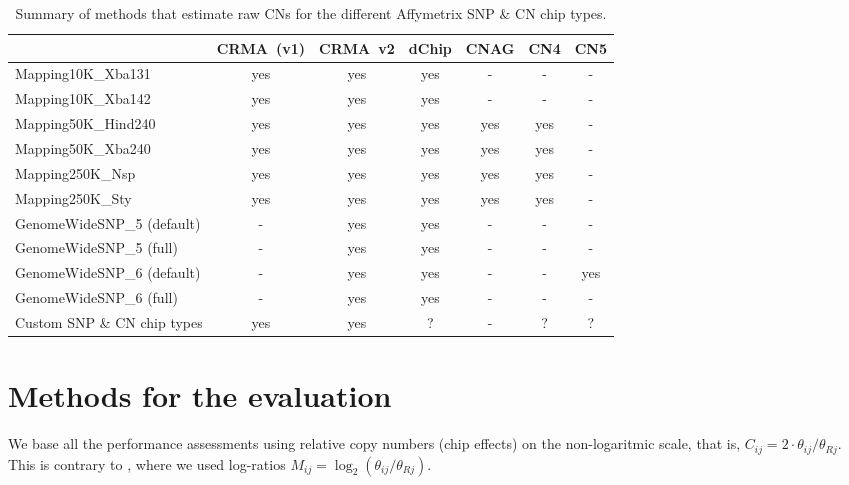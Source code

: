 \documentclass[10pt,a4paper]{article}
\begin{document}

\begin{table}[htp]
\begin{center}
\begin{tabular}{|l|cc|c|c|cc|}
\hline
                             & CRMA~(v1) & CRMA~v2 & dChip & CNAG & CN4 & CN5 \\
\hline
\hline
Mapping10K\_Xba131           & yes     & yes       & yes   &    - &   - &  -  \\
Mapping10K\_Xba142           & yes     & yes       & yes   &    - &   - &  -  \\
\hline
Mapping50K\_Hind240          & yes     & yes       & yes   &  yes & yes &  -  \\
Mapping50K\_Xba240           & yes     & yes       & yes   &  yes & yes &  -  \\
\hline
Mapping250K\_Nsp             & yes     & yes       & yes   &  yes & yes &  -  \\
Mapping250K\_Sty             & yes     & yes       & yes   &  yes & yes &  -  \\
\hline
GenomeWideSNP\_5 (default)   &  -      & yes       & yes   &    - &  -  &  -  \\
GenomeWideSNP\_5 (full)      &  -      & yes       & yes   &    - &  -  &  -  \\
\hline
GenomeWideSNP\_6 (default)   &  -      & yes       & yes   &    - &  -  & yes \\
GenomeWideSNP\_6 (full)      &  -      & yes       & yes   &    - &  -  &  -  \\
\hline
Custom SNP \& CN chip types  &  yes    & yes       &   ?   &    - &  ?  &  ?  \\
\hline
\end{tabular}
\end{center}
\caption{Summary of methods that estimate raw CNs for the different Affymetrix SNP \& CN chip types.}
\label{tblSummaryOfMethods}
\end{table}



\clearpage
\section{Methods for the evaluation}
We base all the performance assessments using relative copy numbers (chip effects) on the non-logaritmic scale, that is, $C_{ij}=2\cdot\theta_{ij}/\theta_{Rj}$.  This is contrary to \cite{BengtssonH_etal_2008a}, where we used log-ratios $M_{ij}=\log_2(\theta_{ij}/\theta_{Rj})$.  
\end{document}
